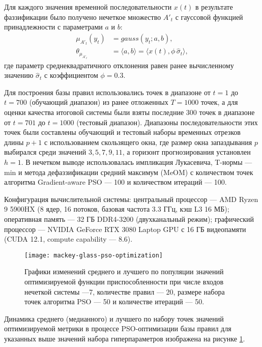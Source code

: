 Для каждого значения временной последовательности $x(t)$ в результате фаззификации было получено нечеткое множество $A'_t$ с гауссовой функцией принадлежности с параметрами $a$ и $b$:
\begin{equation*}
	\begin{aligned}
		\mu_{A'_t}(y_t) &= gauss(y_t; a, b), \\
		\theta_{\mu_{A'_t}} &= \langle a, b \rangle = \langle x(t), \phi\,\hat{\sigma}_t\rangle,
	\end{aligned}
\end{equation*}
где параметр среднеквадратичного отклонения равен ранее вычисленному значению $\hat{\sigma}_t$ с коэффициентом $\phi = 0.3$.



Для построения базы правил использовались точек в диапазоне от $t=1$ до $t=700$ (обучающий диапазон) из ранее отложенных $T=1000$ точек, а для оценки качества итоговой системы были взяты последние 300 точек в диапазоне от $t=701$ до $t=1000$ (тестовый диапазон). Диапазоны последовательности этих точек были составлены обучающий и тестовый наборы временных отрезков длины $p+1$ с использованием скользящего окна, где размер окна запаздывания $p$ выбирался среди значений $3,5,7,9,11$, а горизонт прогнозирования установлен $h=1$. В нечетком выводе использовалась импликация Лукасевича, T-нормы --- min и метода дефаззификации средний максимум (MeOM) с количеством точек алгоритма Gradient-aware PSO --- 100 и количеством итераций --- 100.

Конфигурация вычислительной системы: центральный процессор --- AMD Ryzen 9 5900HX (8 ядер, 16 потоков, базовая частота 3.3 ГГц, кэш L3 16 МБ); оперативная память --- 32 ГБ DDR4-3200 (двухканальный режим); графический процессор --- NVIDIA GeForce RTX 3080 Laptop GPU с 16 ГБ видеопамяти (CUDA 12.1, compute capability --- 8.6).

\begin{figure}
	\centering
	\texttt{[image: mackey-glass-pso-optimization]}
	\caption{Графики изменений среднего и лучшего по популяции значений оптимизируемой функции приспособленности при числе входов нечеткой системы ---7, количестве правил --- 20, размере набора точек алгоритма PSO --- 50 и количестве итераций --- 50.}
	\label{fig:mackey-glass-pso-optimization}
\end{figure}

Динамика среднего (медианного) и лучшего по набору точек значений оптимизируемой метрики в процессе PSO-оптимизации базы правил для указанных выше значений набора гиперпараметров изображена на рисунке \cref{fig:mackey-glass-pso-optimization}.

